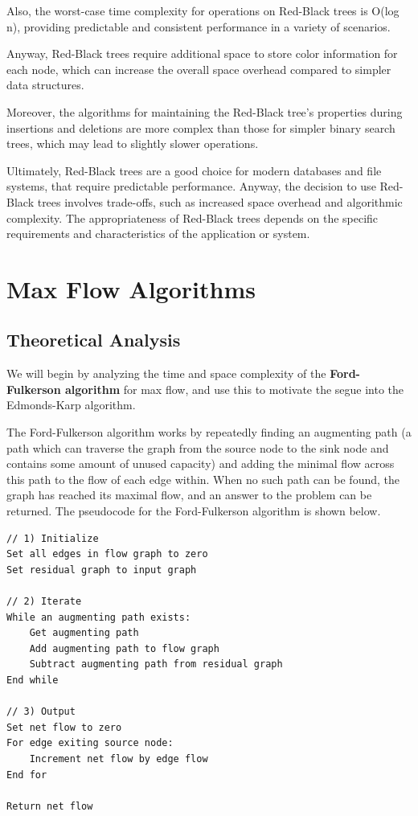 \documentclass[12pt]{amsart}
\begin{document}
    Also, the worst-case time complexity for operations on Red-Black trees is O(log n), providing predictable and consistent performance in a variety of scenarios.
    
    Anyway, Red-Black trees require additional space to store color information for each node, which can increase the overall space overhead compared to simpler data structures.
    
    Moreover, the algorithms for maintaining the Red-Black tree's properties during insertions and deletions are more complex than those for simpler binary search trees, which may lead to slightly slower operations.
    
    Ultimately, Red-Black trees are a good choice for modern databases and file systems, that require predictable performance. 
    Anyway, the decision to use Red-Black trees involves trade-offs, such as increased space overhead and algorithmic complexity.
    The appropriateness of Red-Black trees depends on the specific requirements and characteristics of the application or system.
    
\section{Max Flow Algorithms}

\subsection{Theoretical Analysis}

    We will begin by analyzing the time and space complexity
    of the \textbf{Ford-Fulkerson algorithm} for max flow, and
    use this to motivate the segue into the Edmonds-Karp
    algorithm.

    The Ford-Fulkerson algorithm works by repeatedly finding an
    augmenting path (a path which can traverse the graph from
    the source node to the sink node and contains some amount of
    unused capacity) and adding the minimal flow across this
    path to the flow of each edge within. When no such path can
    be found, the graph has reached its maximal flow, and an
    answer to the problem can be returned. The pseudocode for
    the Ford-Fulkerson algorithm is shown below.

\begin{verbatim}
// 1) Initialize
Set all edges in flow graph to zero
Set residual graph to input graph

// 2) Iterate
While an augmenting path exists:
    Get augmenting path
    Add augmenting path to flow graph
    Subtract augmenting path from residual graph
End while

// 3) Output
Set net flow to zero
For edge exiting source node:
    Increment net flow by edge flow
End for

Return net flow
\end{verbatim}
\end{document}
